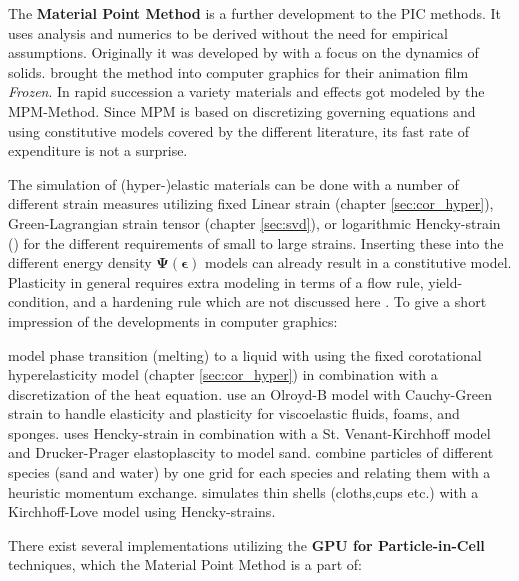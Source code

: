 \documentclass[m,times]{cgMA}
\begin{document}
The \textbf{Material Point Method} is a further development to the PIC methods. It uses analysis and numerics to be derived without the need for empirical assumptions. Originally it was developed by \cite{sulsky1995application} with a focus on the dynamics of solids. \cite{MPM:SNOW} brought the method into computer graphics for their animation film \textit{Frozen}. In rapid succession a variety materials and effects got modeled by the MPM-Method. Since MPM is based on discretizing governing equations and using constitutive models covered by the different literature, its fast rate of expenditure is not a surprise.

The simulation of (hyper-)elastic materials can be done with a number of different strain measures utilizing fixed Linear strain (chapter \ref{sec:cor_hyper}), Green-Lagrangian strain tensor (chapter \ref{sec:svd}), or logarithmic Hencky-strain (\cite{MPM:SHELLS}) for the different requirements of small to large strains. Inserting these into the different energy density $\boldsymbol{\Psi}(\boldsymbol{\epsilon})$ models can already result in a constitutive model. Plasticity in general requires extra modeling in terms of a flow rule, yield-condition, and a hardening rule which are not discussed here \cite{ochsner2014elasto}. To give a short impression of the developments in computer graphics:

\cite{MPM:PHASE_CHANGE} model phase transition (melting) to a liquid with using the fixed corotational hyperelasticity model (chapter \ref{sec:cor_hyper}) in combination with a discretization of the heat equation. \cite{MPM:OLROYDB} use an Olroyd-B model with Cauchy-Green strain to handle elasticity and plasticity for viscoelastic fluids, foams, and sponges. \cite{MPM:DRUCKER} uses Hencky-strain in combination with a St. Venant-Kirchhoff model and Drucker-Prager elastoplascity to model sand.
\cite{MPM:MULTI} combine particles of different species (sand and water) by one grid for each species and relating them with a heuristic momentum exchange. \cite{MPM:SHELLS} simulates thin shells (cloths,cups etc.) with a Kirchhoff-Love model using Hencky-strains.

There exist several implementations utilizing the \textbf{GPU for Particle-in-Cell} techniques, which the Material Point Method is a part of:
\end{document}
